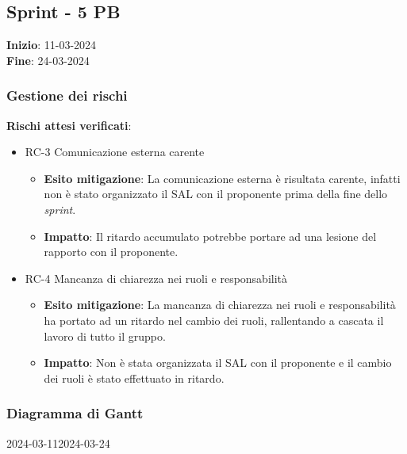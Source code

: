 \subsection{Sprint - 5 PB}
\textbf{Inizio}: 11-03-2024 \\
\textbf{Fine}: 24-03-2024

\subsubsection{Gestione dei rischi}
\textbf{Rischi attesi verificati}:

\begin{itemize}
	\item RC-3 Comunicazione esterna carente
	      \begin{itemize}
		      \item \textbf{Esito mitigazione}: La comunicazione esterna è
		            risultata carente, infatti non è stato organizzato il SAL
		            con il proponente prima della fine dello \textit{sprint}.

		      \item \textbf{Impatto}: Il ritardo accumulato potrebbe portare
		            ad una lesione del rapporto con il proponente.
	      \end{itemize}

	\item RC-4 Mancanza di chiarezza nei ruoli e responsabilità
	      \begin{itemize}
		      \item \textbf{Esito mitigazione}: La mancanza di chiarezza nei
		            ruoli e responsabilità ha portato ad un ritardo nel cambio
		            dei ruoli, rallentando a cascata il lavoro di tutto il
		            gruppo.

		      \item \textbf{Impatto}: Non è stata organizzata il SAL con il
		            proponente e il cambio dei ruoli è stato effettuato in
		            ritardo.
	      \end{itemize}
\end{itemize}

\subsubsection{Diagramma di Gantt}

\begin{ganttchart}[
		x unit=0.6cm, %
		y unit chart=0.6cm,
		bar/.style={fill=blue!50},
		bar height=0.5,
		time slot format=isodate,
		time slot unit=day,
		vgrid,
		today=2024-03-12,
		today rule/.style={draw=red, ultra thick}
	]{2024-03-11}{2024-03-24}
	 \\
	 \\
	 \\
	 \\
	 \\
\end{ganttchart}

